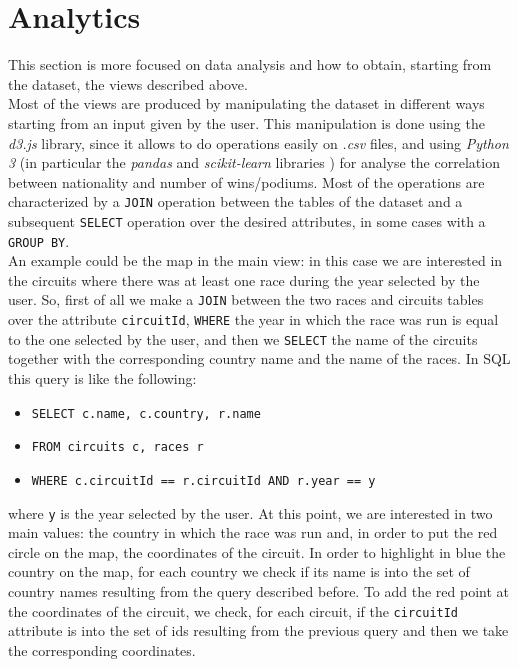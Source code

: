 \documentclass[11pt,twocolumn,letterpaper]{article}
\begin{document}
\section{Analytics}
This section is more focused on data analysis and how to obtain, starting from the dataset, the views described above.\\
Most of the views are produced by manipulating the dataset in different ways starting from an input given by the user. This manipulation is done using the \textit{d3.js} \cite{D3} library, since it allows to do operations easily on \textit{.csv} files, and using \textit{Python 3} (in particular the \textit{pandas} \cite{Pandas} and \textit{scikit-learn} libraries \cite{Scikit-learn}) for analyse the correlation between nationality and number of wins/podiums. Most of the operations are characterized by a \texttt{JOIN} operation between the tables of the dataset and a subsequent \texttt{SELECT} operation over the desired attributes, in some cases with a \texttt{GROUP BY}.\\
An example could be the map in the main view: in this case we are interested in the circuits where there was at least one race during the year selected by the user. So, first of all we make a \texttt{JOIN} between the two races and circuits tables over the attribute \texttt{circuitId}, \texttt{WHERE} the year in which the race was run is equal to the one selected by the user, and then we \texttt{SELECT} the name of the circuits together with the corresponding country name and the name of the races. In SQL this query is like the following:
\begin{itemize}
	\item \texttt{SELECT c.name, c.country, r.name}
	\item \texttt{FROM circuits c, races r}
	\item \texttt{WHERE c.circuitId == r.circuitId AND r.year == y}
\end{itemize}
where \texttt{y} is the year selected by the user.
At this point, we are interested in two main values: the country in which the race was run and, in order to put the red circle on the map, the coordinates of the circuit. In order to highlight in blue the country on the map, for each country we check if its name is into the set of country names resulting from the query described before. To add the red point at the coordinates of the circuit, we check, for each circuit, if the \texttt{circuitId} attribute is into the set of ids resulting from the previous query and then we take the corresponding coordinates.\\
\end{document}
